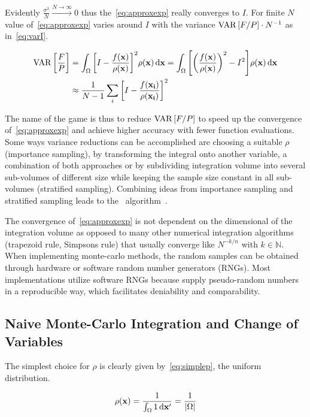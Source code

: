 Evidently \(\frac{\sigma^2}{N}\xrightarrow{N\rightarrow\infty} 0\)
thus the~\eqref{eq:approxexp} really converges to \(I\). For finite
\(N\) value of~\eqref{eq:approxexp} varies around \(I\) with the
variance \(\operatorname{VAR}\qty[F/P]\cdot N^{-1}\) as in~\eqref{eq:varI}.

\begin{align}
  \operatorname{VAR}\qty[\frac{F}{P}] &= \int_\Omega \qty[I -
  \frac{f(\vb{x})}{\rho(\vb{x})}]^2 \rho({\vb{x}}) \dd{\vb{x}} =
  \int_\Omega \qty[\qty(\frac{f(\vb{x})}{\rho(\vb{x})})^2 -
  I^2]\rho({\vb{x}}) \dd{\vb{x}}   \label{eq:varI}
 \\
  &\approx \frac{1}{N - 1}\sum_i \qty[I -
  \frac{f(\vb{x_i})}{\rho(\vb{x_i})}]^2  \label{eq:varI-approx}
\end{align}

The name of the game is thus to reduce \(\operatorname{VAR}\qty[F/P]\) to speed up
the convergence of~\eqref{eq:approxexp} and achieve higher accuracy
with fewer function evaluations. Some ways variance reductions can be
accomplished are choosing a suitable \(\rho\) (importance sampling),
by transforming the integral onto another variable, a combination of
both approaches or by subdividing integration volume into several
sub-volumes of different size while keeping the sample size constant
in all sub-volumes (stratified sampling). Combining ideas from
importance sampling and stratified sampling leads to the \vegas\
algorithm~\cite{Lepage:19781an}.

The convergence of~\eqref{eq:approxexp} is not dependent on the
dimensional of the integration volume as opposed to many other
numerical integration algorithms (trapezoid rule, Simpsons rule) that
usually converge like \(N^{-k/n}\) with \(k\in\mathbb{N}\).  When
implementing monte-carlo methods, the random samples can be obtained
through hardware or software random number generators (RNGs). Most
implementations utilize software RNGs because supply pseudo-random
numbers in a reproducible way, which facilitates deniability and
comparability.

\subsection{Naive Monte-Carlo Integration and Change of Variables}
\label{sec:naivechange}

The simplest choice for \(\rho\) is clearly given
by~\eqref{eq:simplep}, the uniform distribution.

\begin{equation}
  \label{eq:simplep}
  \rho(\vb{x}) = \frac{1}{\int_{\Omega}1\dd{\vb{x'}}} =
  \frac{1}{\abs{\Omega}}
\end{equation}

